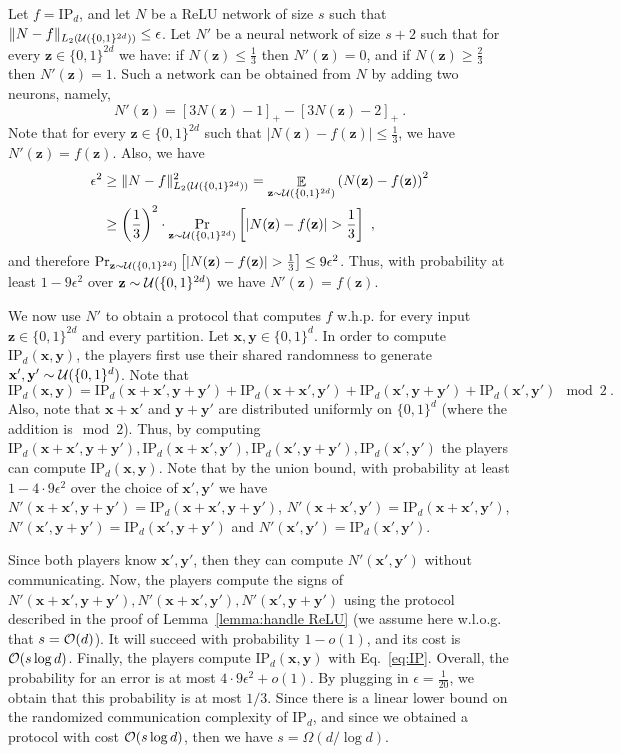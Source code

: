 \documentclass[11pt]{article}
\newcommand{\bx}{\mathbf{x}}
\newcommand{\bz}{\mathbf{z}}
\newcommand{\by}{\mathbf{y}}
\newcommand{\co}{{\cal O}}
\newcommand{\cu}{{\cal U}}
\DeclareMathOperator*{\E}{\mathbb{E}}
\newcommand{\snorm}[1]{\|#1\|} %
\begin{document}
Let $f=\text{IP}_d$, and let $N$ be a ReLU network of size $s$ such that $\snorm{N-f}_{L_2(\cu(\{0,1\}^{2d}))} \leq \epsilon$. Let $N'$ be a neural network of size $s+2$ such that for every $\bz \in \{0,1\}^{2d}$ we have: if $N(\bz) \leq \frac{1}{3}$ then $N'(\bz)=0$, and if $N(\bz) \geq \frac{2}{3}$ then $N'(\bz)=1$. Such a network can be obtained from $N$ by adding two neurons, namely, 
\[
    N'(\bz) = \left[3N(\bz)-1\right]_+ - \left[3N(\bz)-2\right]_+~.
\]
Note that for every $\bz \in \{0,1\}^{2d}$ such that $|N(\bz)-f(\bz)| \leq \frac{1}{3}$, we have $N'(\bz)=f(\bz)$. 
Also, we have 
\begin{align*}
    \epsilon^2 
    &\geq \snorm{N-f}_{L_2(\cu(\{0,1\}^{2d}))}^2 
    = \E_{\bz \sim \cu(\{0,1\}^{2d})}\left(N(\bz)-f(\bz)\right)^2
    \\
    &\geq \left(\frac{1}{3}\right)^2 \cdot \Pr_{\bz \sim \cu(\{0,1\}^{2d})}\left[|N(\bz)-f(\bz)| > \frac{1}{3} \right]~,
\end{align*}
and therefore $\Pr_{\bz \sim \cu(\{0,1\}^{2d})}\left[|N(\bz)-f(\bz)| > \frac{1}{3} \right] \leq 9 \epsilon^2$.
Thus, with probability at least $1-9 \epsilon^2$ over $\bz \sim \cu(\{0,1\}^{2d})$ we have $N'(\bz)=f(\bz)$.

We now use $N'$ to obtain a protocol that computes $f$ w.h.p. for every input $\bz \in \{0,1\}^{2d}$ and every partition. Let $\bx,\by \in \{0,1\}^d$. In order to compute $\text{IP}_d(\bx,\by)$, the players first use their shared randomness to generate $\bx',\by' \sim \cu(\{0,1\}^{d})$. Note that
\begin{equation}
\label{eq:IP}
	\text{IP}_d(\bx,\by) 
	= \text{IP}_d(\bx+\bx',\by+\by') + \text{IP}_d(\bx+\bx',\by') + \text{IP}_d(\bx',\by+\by') + \text{IP}_d(\bx',\by') \mod 2~.
\end{equation}
Also, note that $\bx+\bx'$ and $\by+\by'$ are distributed uniformly on $\{0,1\}^d$ (where the addition is$\mod 2$).
Thus, by computing $\text{IP}_d(\bx+\bx',\by+\by'), \text{IP}_d(\bx+\bx',\by'), \text{IP}_d(\bx',\by+\by'), \text{IP}_d(\bx',\by')$ the players can compute $\text{IP}_d(\bx,\by)$.
Note that by the union bound, with probability at least $1 - 4 \cdot 9\epsilon^2$ over the choice of $\bx',\by'$ we have $N'(\bx+\bx',\by+\by')=\text{IP}_d(\bx+\bx',\by+\by')$, $N'(\bx+\bx',\by')=\text{IP}_d(\bx+\bx',\by')$, $N'(\bx',\by+\by')=\text{IP}_d(\bx',\by+\by')$ and $N'(\bx',\by')=\text{IP}_d(\bx',\by')$.

Since both players know $\bx',\by'$, then they can compute $N'(\bx',\by')$ without communicating. Now, the players compute the signs of $N'(\bx+\bx',\by+\by'),N'(\bx+\bx',\by'),N'(\bx',\by+\by')$ using the protocol described in the proof of Lemma~\ref{lemma:handle ReLU} (we assume here w.l.o.g. that $s=\co(d)$). It will succeed with probability $1-o(1)$, and its cost is $\co(s \log d)$.
Finally, the players compute $\text{IP}_d(\bx,\by)$ with Eq.~\ref{eq:IP}. Overall, the probability for an error is at most $4 \cdot 9\epsilon^2 + o(1)$. 
By plugging in $\epsilon=\frac{1}{20}$, we obtain that this probability is at most $1/3$.
Since there is a linear lower bound on the randomized communication complexity of $\text{IP}_d$, and since we obtained a protocol with cost $\co(s \log d)$, then we have $s=\Omega(d/\log d)$.
\end{document}
